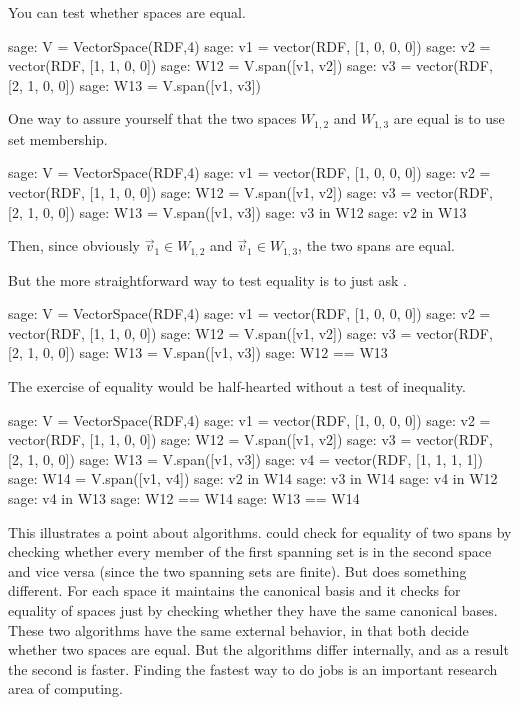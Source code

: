 You can test whether spaces are equal.
\begin{sagecommandline}
sage: V = VectorSpace(RDF,4)
sage: v1 = vector(RDF, [1, 0, 0, 0])
sage: v2 = vector(RDF, [1, 1, 0, 0])
sage: W12 = V.span([v1, v2])
sage: v3 = vector(RDF, [2, 1, 0, 0])
sage: W13 = V.span([v1, v3])  
\end{sagecommandline}
\noindent
One way to assure yourself that the two spaces $W_{1,2}$ and $W_{1,3}$ 
are equal is to use set membership.
\begin{sagecommandline}
sage: V = VectorSpace(RDF,4)
sage: v1 = vector(RDF, [1, 0, 0, 0])
sage: v2 = vector(RDF, [1, 1, 0, 0])
sage: W12 = V.span([v1, v2])
sage: v3 = vector(RDF, [2, 1, 0, 0])
sage: W13 = V.span([v1, v3])  
sage: v3 in W12
sage: v2 in W13
\end{sagecommandline}
\noindent
Then, since obviously $\vec{v}_1\in W_{1,2}$ and $\vec{v}_1\in W_{1,3}$, the two
spans are equal.

But the more straightforward way to test equality is to just ask \Sage{}.
\begin{sagecommandline}
sage: V = VectorSpace(RDF,4)
sage: v1 = vector(RDF, [1, 0, 0, 0])
sage: v2 = vector(RDF, [1, 1, 0, 0])
sage: W12 = V.span([v1, v2])
sage: v3 = vector(RDF, [2, 1, 0, 0])
sage: W13 = V.span([v1, v3])  
sage: W12 == W13
\end{sagecommandline}
\noindent
The exercise of \inlinecode{==} equality 
would be half-hearted without a test of inequality. 
\begin{sagecommandline}
sage: V = VectorSpace(RDF,4)
sage: v1 = vector(RDF, [1, 0, 0, 0])
sage: v2 = vector(RDF, [1, 1, 0, 0])
sage: W12 = V.span([v1, v2])
sage: v3 = vector(RDF, [2, 1, 0, 0])
sage: W13 = V.span([v1, v3])  
sage: v4 = vector(RDF, [1, 1, 1, 1])
sage: W14 = V.span([v1, v4])
sage: v2 in W14
sage: v3 in W14                                 
sage: v4 in W12
sage: v4 in W13
sage: W12 == W14                                                              
sage: W13 == W14
\end{sagecommandline}

This illustrates a point about algorithms.
\Sage{} could check for equality of two spans 
by checking whether every member of the first spanning set is in the
second space and vice versa (since the two spanning sets are finite). 
But \Sage{} does something different.
For each space it maintains the canonical basis
and it checks for equality of spaces
just by checking whether they have the same canonical bases.
These two algorithms 
have the same external behavior, in that both decide whether
two spaces are equal.
But the algorithms differ internally, and as a result the second is faster.
Finding the fastest way to do jobs is an important research area of computing.


